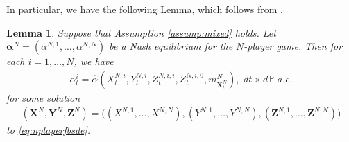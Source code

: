 \documentclass[11pt,reqno]{amsart}
\numberwithin{equation}{section}
\newtheorem{lemma}[theorem]{Lemma}
\theoremstyle{definition}
\newtheorem{remark}[theorem]{Remark}
\newcommand{\bX}{\mathbf{X}}
\newcommand{\bY}{\mathbf{Y}}
\newcommand{\bZ}{\mathbf{Z}}
\newcommand{\bP}{\mathbb{P}}
\begin{document}
In particular, we have the following Lemma, which follows from \cite[Theorem 2.15]{cardelbook1}. 
\begin{lemma}
\label{lem:N.player.smp}
  Suppose that Assumption \ref{assump:mixed} holds. 
  Let ${\bm \alpha}^N = (\alpha^{N,1},\dots,\alpha^{N,N})$ be a Nash equilibrium for the $N$-player game. Then for each $i=1,\dots,N$, we have
\begin{align*}
  \alpha_t^i = \widehat{\alpha}(X_t^{N,i}, Y_t^{N,i}, Z_t^{N,i,i}, Z_t^{N,i,0}, m_{\bX_t^N}^N), \,\, dt \times d\bP \,\, a.e.
\end{align*}
for some solution 
\begin{align*}
(\bX^N, \bY^N, \bZ^N) = \big( (X^{N,1},\dots,X^{N,N}), (Y^{N,1},\dots,Y^{N,N}), (\bZ^{N,1},\dots,\bZ^{N,N}) \big)
\end{align*}
to \eqref{eq:nplayerfbsde}.
\end{lemma}


\end{document}
